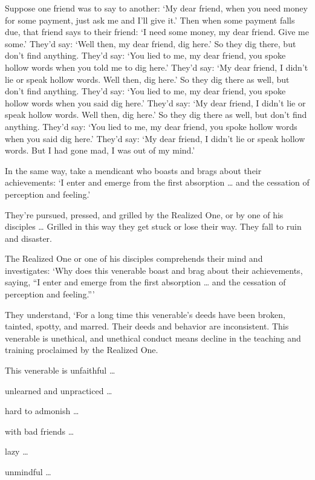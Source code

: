 \documentclass[12pt,openany]{book}%
\begin{document}
Suppose one friend was to say to another: ‘My dear friend, when you need money for some payment, just ask me and I’ll give it.’ Then when some payment falls due, that friend says to their friend: ‘I need some money, my dear friend. Give me some.’ They’d say: ‘Well then, my dear friend, dig here.’ So they dig there, but don’t find anything. They’d say: ‘You lied to me, my dear friend, you spoke hollow words when you told me to dig here.’ They’d say: ‘My dear friend, I didn’t lie or speak hollow words. Well then, dig here.’ So they dig there as well, but don’t find anything. They’d say: ‘You lied to me, my dear friend, you spoke hollow words when you said dig here.’ They’d say: ‘My dear friend, I didn’t lie or speak hollow words. Well then, dig here.’ So they dig there as well, but don’t find anything. They’d say: ‘You lied to me, my dear friend, you spoke hollow words when you said dig here.’ They’d say: ‘My dear friend, I didn’t lie or speak hollow words. But I had gone mad, I was out of my mind.’ 

In the same way, take a mendicant who boasts and brags about their achievements: ‘I enter and emerge from the first absorption … and the cessation of perception and feeling.’ 

They’re pursued, pressed, and grilled by the Realized One, or by one of his disciples … Grilled in this way they get stuck or lose their way. They fall to ruin and disaster. 

The Realized One or one of his disciples comprehends their mind and investigates: ‘Why does this venerable boast and brag about their achievements, saying, “I enter and emerge from the first absorption … and the cessation of perception and feeling.”’ 

They understand, ‘For a long time this venerable’s deeds have been broken, tainted, spotty, and marred. Their deeds and behavior are inconsistent. This venerable is unethical, and unethical conduct means decline in the teaching and training proclaimed by the Realized One. 

This venerable is unfaithful … 

unlearned and unpracticed … 

hard to admonish … 

with bad friends … 

lazy … 

unmindful … 
\end{document}
